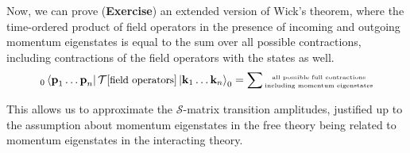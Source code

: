 \noindent Now, we can prove (\textbf{Exercise}) an extended version of Wick's theorem, where the time-ordered product of field operators in the presence of incoming and outgoing momentum eigenstates is equal to the sum over all possible contractions, including contractions of the field operators with the states as well.
\begin{equation}
_{0}\bra{\textbf{p}_1 \dots \textbf{p}_n} \mathcal{T}[{\small\text{field operators}}] \ket{\textbf{k}_1 \dots \textbf{k}_n} _{0} = \sum {\tiny \stackanchor{all possible full contractions}{including momentum eigenstates}}
\end{equation}

\noindent This allows us to approximate the $\mathcal{S}$-matrix transition amplitudes, justified up to the assumption about momentum eigenstates in the free theory being related to momentum eigenstates in the interacting theory.